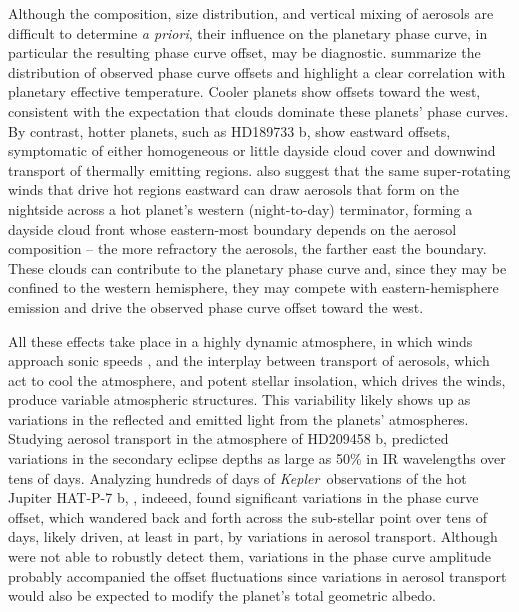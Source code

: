 \documentclass[manuscript]{aastex62}
\newcommand{\kepler}{{\it Kepler}}
\begin{document}
Although the composition, size distribution, and vertical mixing of aerosols are difficult to determine \emph{a priori}, their influence on the planetary phase curve, in particular the resulting phase curve offset, may be diagnostic. \citet{2016ApJ...828...22P} summarize the distribution of observed phase curve offsets and highlight a clear correlation with planetary effective temperature. Cooler planets show offsets toward the west, consistent with the expectation that clouds dominate these planets' phase curves. By contrast, hotter planets, such as HD189733 b, show eastward offsets, symptomatic of either homogeneous or little dayside cloud cover and downwind transport of thermally emitting regions. \citet{2016ApJ...828...22P} also suggest that the same super-rotating winds that drive hot regions eastward can draw aerosols that form on the nightside across a hot planet's western (night-to-day) terminator, forming a dayside cloud front whose eastern-most boundary depends on the aerosol composition -- the more refractory the aerosols, the farther east the boundary. These clouds can contribute to the planetary phase curve and, since they may be confined to the western hemisphere, they may compete with eastern-hemisphere emission and drive the observed phase curve offset toward the west.

All these effects take place in a highly dynamic atmosphere, in which winds approach sonic speeds \citep{2018ApJ...853..133K}, and the interplay between transport of aerosols, which act to cool the atmosphere, and potent stellar insolation, which drives the winds, produce variable atmospheric structures. This variability likely shows up as variations in the reflected and emitted light from the planets' atmospheres. Studying aerosol transport in the atmosphere of HD209458 b, \citet{2013A&A...558A..91P} predicted variations in the secondary eclipse depths as large as 50\% in IR wavelengths over tens of days. Analyzing hundreds of days of \kepler\ observations of the hot Jupiter HAT-P-7 b, \citet{2016NatAs...1E...4A}, indeeed, found significant variations in the phase curve offset, which wandered back and forth across the sub-stellar point over tens of days, likely driven, at least in part, by variations in aerosol transport. Although \citet{2016NatAs...1E...4A} were not able to robustly detect them, variations in the phase curve amplitude probably accompanied the offset fluctuations since variations in aerosol transport would also be expected to modify the planet's total geometric albedo. 
\end{document}
